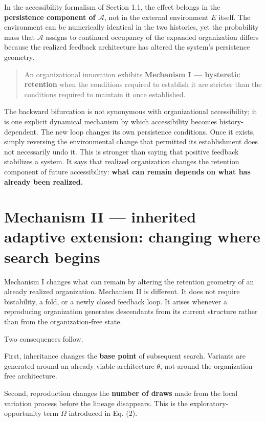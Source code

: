 \documentclass[11pt,a4paper]{article}
\begin{document}
In the accessibility formalism of Section 1.1, the effect belongs in the
\textbf{persistence component of \(\mathcal A\)}, not in the external
environment \(E\) itself. The environment can be numerically identical
in the two histories, yet the probability mass that \(\mathcal A\)
assigns to continued occupancy of the expanded organization differs
because the realized feedback architecture has altered the system's
persistence geometry.

\begin{quote}
An organizational innovation exhibits \textbf{Mechanism I --- hysteretic
retention} when the conditions required to establish it are stricter
than the conditions required to maintain it once established.
\end{quote}

The backward bifurcation is not synonymous with organizational
accessibility; it is one explicit dynamical mechanism by which
accessibility becomes history-dependent. The new loop changes its own
persistence conditions. Once it exists, simply reversing the
environmental change that permitted its establishment does not
necessarily undo it. This is stronger than saying that positive feedback
stabilizes a system. It says that realized organization changes the
retention component of future accessibility: \textbf{what can remain
depends on what has already been realized.}

\section{Mechanism II --- inherited adaptive extension: changing where
search
begins}\label{mechanism-ii-inherited-adaptive-extension-changing-where-search-begins}

Mechanism I changes what can remain by altering the retention geometry
of an already realized organization. Mechanism II is different. It does
not require bistability, a fold, or a newly closed feedback loop. It
arises whenever a reproducing organization generates descendants from
its current structure rather than from the organization-free state.

Two consequences follow.

First, inheritance changes the \textbf{base point} of subsequent search.
Variants are generated around an already viable architecture \(\theta\),
not around the organization-free architecture.

Second, reproduction changes the \textbf{number of draws} made from the
local variation process before the lineage disappears. This is the
exploratory-opportunity term \(\Omega\) introduced in Eq. (2).
\end{document}
